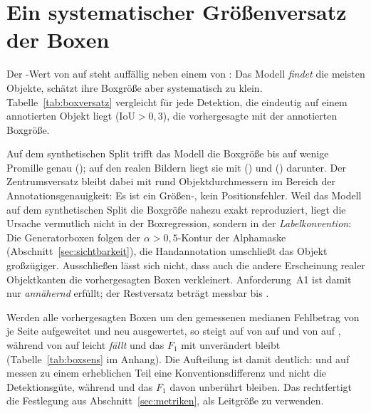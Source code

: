 \section{Ein systematischer Größenversatz der Boxen}
\label{sec:boxversatz}

Der \mAPseven{}-Wert von \zrefTestMapS{} auf  steht auffällig neben
einem \mAPfifty{} von \zrefTestMap: Das Modell \emph{findet} die meisten
Objekte, schätzt ihre Boxgröße aber systematisch zu klein.
Tabelle~\ref{tab:boxversatz} vergleicht für jede Detektion, die eindeutig auf
einem annotierten Objekt liegt ($\mathrm{IoU} > 0{,}3$), die vorhergesagte mit
der annotierten Boxgröße.



Auf dem synthetischen Split trifft das Modell die Boxgröße bis auf wenige
Promille genau (\zboxSvalRatio); auf den realen Bildern liegt sie mit
\zboxValRatio{} () und \zboxTestRatio{} () darunter. Der
Zentrumsversatz bleibt dabei mit rund \zboxTestCtr{} Objektdurchmessern im
Bereich der Annotationsgenauigkeit: Es ist ein Größen-, kein Positionsfehler.
Weil das Modell auf dem synthetischen Split die Boxgröße nahezu exakt
reproduziert, liegt die Ursache vermutlich nicht in der Boxregression, sondern
in der \emph{Labelkonvention}: Die Generatorboxen folgen der
$\alpha > 0{,}5$-Kontur der Alphamaske (Abschnitt~\ref{sec:sichtbarkeit}), die
Handannotation umschließt das Objekt großzügiger. Ausschließen lässt sich
nicht, dass auch die andere Erscheinung realer Objektkanten die vorhergesagten
Boxen verkleinert. Anforderung~A1 ist damit nur
\emph{annähernd} erfüllt; der Restversatz beträgt messbar \zboxValOff{} bis
\zboxTestOff\px.

Werden alle vorhergesagten Boxen um den gemessenen medianen Fehlbetrag von
\zsensTestGrow\px{} je Seite aufgeweitet und neu ausgewertet, so steigt
\mAPseven{} auf  von \zsensTestMapSOrig{} auf
\textbf{\zsensTestMapSNeu} und \mAPall{} von \zsensTestMapAOrig{} auf
\textbf{\zsensTestMapANeu}, während \mAPfifty{} von \zsensTestMapOrig{} auf
\zsensTestMapNeu{} leicht \emph{fällt} und das $F_1$ mit \zsensTestFfNeu{}
unverändert bleibt (Tabelle~\ref{tab:boxsens} im Anhang). Die Aufteilung ist
damit deutlich: \mAPseven{} und \mAPall{} auf  messen zu einem
erheblichen Teil eine Konventionsdifferenz und nicht die Detektionsgüte,
während \mAPfifty{} und das $F_1$ davon unberührt bleiben. Das rechtfertigt
die Festlegung aus Abschnitt~\ref{sec:metriken}, \mAPfifty{} als Leitgröße zu
verwenden.